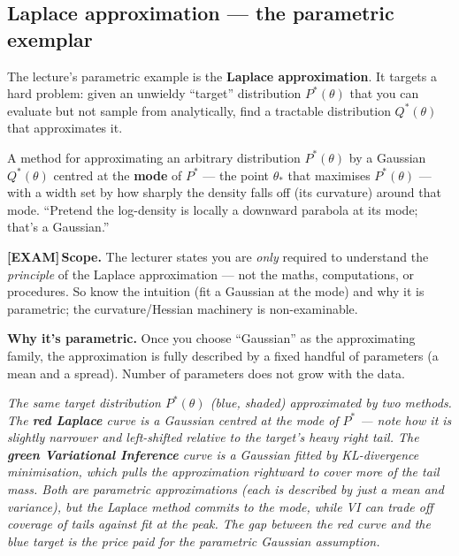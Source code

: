 \documentclass[11pt, a4paper]{article}
\newcommand{\examflag}{\textcolor{tipBd}{\textbf{[EXAM]}}\,}
\begin{document}
\subsection{Laplace approximation — the parametric exemplar}

The lecture's parametric example is the \textbf{Laplace approximation}. It targets a hard problem: given an unwieldy ``target'' distribution $P^*(\theta)$ that you can evaluate but not sample from analytically, find a tractable distribution $Q^*(\theta)$ that approximates it.

\begin{defbox}
A method for approximating an arbitrary distribution $P^*(\theta)$ by a Gaussian $Q^*(\theta)$ centred at the \textbf{mode} of $P^*$ — the point $\theta_*$ that maximises $P^*(\theta)$ — with a width set by how sharply the density falls off (its curvature) around that mode. ``Pretend the log-density is locally a downward parabola at its mode; that's a Gaussian.''
\end{defbox}

\examflag{}\textbf{Scope.} The lecturer states you are \emph{only} required to understand the \emph{principle} of the Laplace approximation — not the maths, computations, or procedures. So know the intuition (fit a Gaussian at the mode) and why it is parametric; the curvature/Hessian machinery is non-examinable.

\textbf{Why it's parametric.} Once you choose ``Gaussian'' as the approximating family, the approximation is fully described by a fixed handful of parameters (a mean and a spread). Number of parameters does not grow with the data.

\begin{center}

\footnotesize\textit{The same target distribution $P^*(\theta)$ (blue, shaded) approximated by two methods. The \textbf{red Laplace} curve is a Gaussian centred at the mode of $P^*$ --- note how it is slightly narrower and left-shifted relative to the target's heavy right tail. The \textbf{green Variational Inference} curve is a Gaussian fitted by KL-divergence minimisation, which pulls the approximation rightward to cover more of the tail mass. Both are parametric approximations (each is described by just a mean and variance), but the Laplace method commits to the mode, while VI can trade off coverage of tails against fit at the peak. The gap between the red curve and the blue target is the price paid for the parametric Gaussian assumption.}
\end{center}
\end{document}
